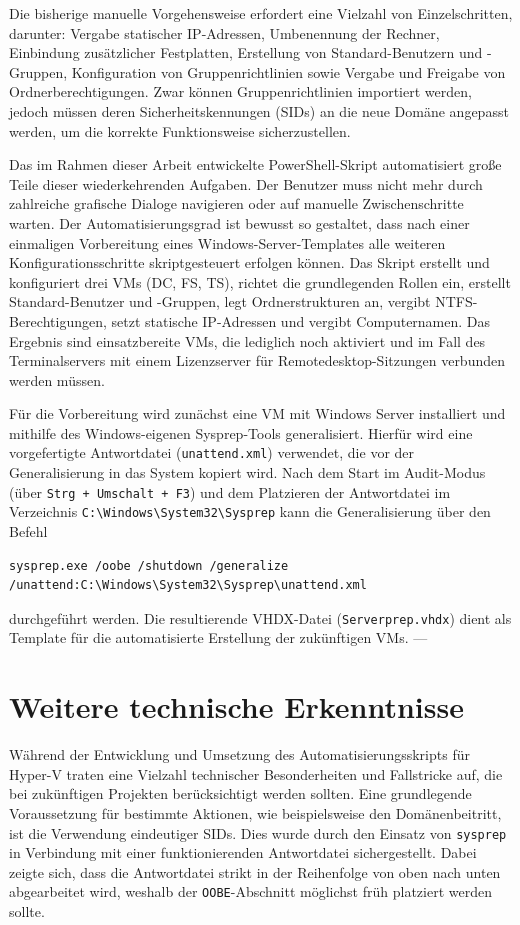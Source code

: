 \documentclass[conference]{IEEEtran}
\begin{document}
Die bisherige manuelle Vorgehensweise erfordert eine Vielzahl von Einzelschritten, darunter: Vergabe statischer IP-Adressen, Umbenennung der Rechner, Einbindung zusätzlicher Festplatten, Erstellung von Standard-Benutzern und -Gruppen, Konfiguration von Gruppenrichtlinien sowie Vergabe und Freigabe von Ordnerberechtigungen. Zwar können Gruppenrichtlinien importiert werden, jedoch müssen deren Sicherheitskennungen (SIDs) an die neue Domäne angepasst werden, um die korrekte Funktionsweise sicherzustellen.

Das im Rahmen dieser Arbeit entwickelte PowerShell-Skript automatisiert große Teile dieser wiederkehrenden Aufgaben. Der Benutzer muss nicht mehr durch zahlreiche grafische Dialoge navigieren oder auf manuelle Zwischenschritte warten. Der Automatisierungsgrad ist bewusst so gestaltet, dass nach einer einmaligen Vorbereitung eines Windows-Server-Templates alle weiteren Konfigurationsschritte skriptgesteuert erfolgen können. Das Skript erstellt und konfiguriert drei VMs (DC, FS, TS), richtet die grundlegenden Rollen ein, erstellt Standard-Benutzer und -Gruppen, legt Ordnerstrukturen an, vergibt NTFS-Berechtigungen, setzt statische IP-Adressen und vergibt Computernamen. Das Ergebnis sind einsatzbereite VMs, die lediglich noch aktiviert und im Fall des Terminalservers mit einem Lizenzserver für Remotedesktop-Sitzungen verbunden werden müssen.

Für die Vorbereitung wird zunächst eine VM mit Windows Server installiert und mithilfe des Windows-eigenen Sysprep-Tools generalisiert. Hierfür wird eine vorgefertigte Antwortdatei (\texttt{unattend.xml}) verwendet, die vor der Generalisierung in das System kopiert wird. Nach dem Start im Audit-Modus (über \texttt{Strg + Umschalt + F3}) und dem Platzieren der Antwortdatei im Verzeichnis \texttt{C:\textbackslash Windows\textbackslash System32\textbackslash Sysprep} kann die Generalisierung über den Befehl
\begin{verbatim}
sysprep.exe /oobe /shutdown /generalize /unattend:C:\Windows\System32\Sysprep\unattend.xml
\end{verbatim}
durchgeführt werden. Die resultierende VHDX-Datei (\texttt{Serverprep.vhdx}) dient als Template für die automatisierte Erstellung der zukünftigen VMs.
---

\section*{Weitere technische Erkenntnisse}

Während der Entwicklung und Umsetzung des Automatisierungsskripts für Hyper-V traten eine Vielzahl technischer Besonderheiten und Fallstricke auf, die bei zukünftigen Projekten berücksichtigt werden sollten. Eine grundlegende Voraussetzung für bestimmte Aktionen, wie beispielsweise den Domänenbeitritt, ist die Verwendung eindeutiger SIDs. Dies wurde durch den Einsatz von \texttt{sysprep} in Verbindung mit einer funktionierenden Antwortdatei sichergestellt. Dabei zeigte sich, dass die Antwortdatei strikt in der Reihenfolge von oben nach unten abgearbeitet wird, weshalb der \texttt{OOBE}-Abschnitt möglichst früh platziert werden sollte.  
\end{document}
